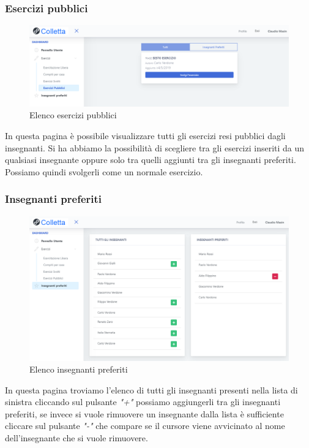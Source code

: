            \subsubsection{Esercizi pubblici}
        	\begin{figure}[H]
            	\centering
            	\includegraphics[width=17cm]{sez/img/studente/esercizipubblici.PNG} 
            	\caption{Elenco esercizi pubblici}\label{fig:1}
        	\end{figure}
        	In questa pagina è possibile visualizzare tutti gli esercizi resi pubblici dagli insegnanti. Si ha abbiamo la possibilità  di scegliere tra gli esercizi inseriti da un qualsiasi insegnante oppure solo tra quelli aggiunti tra gli insegnanti preferiti. Possiamo quindi svolgerli come un normale esercizio. 
        
        
        
\subsubsection{Insegnanti preferiti}
        	\begin{figure}[H]
            	\centering
            	\includegraphics[width=17cm]{sez/img/studente/insegnantepreferito.png} 
            	\caption{Elenco insegnanti preferiti}\label{fig:1}
        	\end{figure}        
        In questa pagina troviamo l'elenco di tutti gli insegnanti presenti nella lista di sinistra cliccando sul pulsante \textit{"+"} possiamo aggiungerli tra gli insegnanti preferiti, se invece si vuole rimuovere un insegnante dalla lista è sufficiente cliccare sul pulsante \textit{"-"} che compare se il cursore viene avvicinato al nome dell'insegnante che si vuole rimuovere.
        
